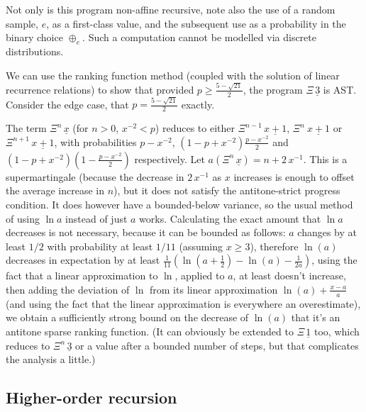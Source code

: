 Not only is this program non-affine recursive,
note also the use of a random sample, $e$, as a first-class value, and the subsequent use as a probability in the binary choice $\oplus_e$.
Such a computation cannot be modelled via discrete distributions. 

We can use the ranking function method (coupled with the solution of linear recurrence relations) to show that provided $p \geq \frac{5 - \sqrt{21}}{2}$, the program $\Xi \, \underline 3$ is AST. 
Consider the edge case, that $p = \frac{5 - \sqrt{21}}{2}$ exactly.

The term $\Xi^n\, \underline x$ (for $n > 0$, $x^{-2} < p$) reduces to either $\Xi^{n-1}\, \underline{x+1}$, $\Xi^n\ \underline{x+1}$ or $\Xi^{n+1}\, \underline{x+1}$, 
with probabilities $p-x^{-2}$, $(1-p+x^{-2})\frac{p-x^{-2}}{2}$ and $(1-p+x^{-2})(1-\frac{p-x^{-2}}{2})$ respectively. 
Let $a(\Xi^n\, \underline x) = n + 2 \, x^{-1}$. 
This is a supermartingale (because the decrease in $2 \, x^{-1}$ as $x$ increases is enough to offset the average increase in $n$), but it does not satisfy the antitone-strict progress condition. 
It does however have a bounded-below variance, so the usual method of using $\ln a$ instead of just $a$ works. 
Calculating the exact amount that $\ln a$ decreases is not necessary, because it can be bounded as follows: 
$a$ changes by at least $1/2$ with probability at least $1/11$ (assuming $x \geq 3$), 
therefore $\ln(a)$ decreases in expectation by at least $\frac{1}{11}(\ln(a+\frac{1}{2}) - \ln(a) -\frac 1 {2a})$, 
using the fact that a linear approximation to $\ln$, applied to $a$, at least doesn't increase, 
then adding the deviation of $\ln$ from its linear approximation $\ln(a) + \frac{x-a}{a}$ 
(and using the fact that the linear approximation is everywhere an overestimate), 
we obtain a sufficiently strong bound on the decrease of $\ln(a)$ that it's an antitone sparse ranking function. 
(It can obviously be extended to $\Xi\, \underline 1$ too, which reduces to $\Xi^n\, \underline 3$ or a value after a bounded number of steps, but that complicates the analysis a little.)

\subsection*{Higher-order recursion}

